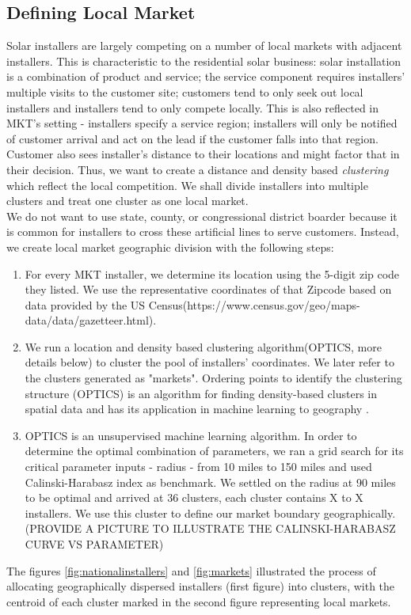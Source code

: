 \documentclass[msom,blindrev]{informs3}
\begin{document}
\subsection{Defining Local Market}
\label{defining_local_market}
Solar installers are largely competing on a number of local markets with adjacent installers.  This is characteristic to the residential solar business: solar installation is a combination of product and service; the service component requires installers' multiple visits to the customer site;  customers tend to only seek out local installers and installers tend to only compete locally. This is also reflected in MKT's setting - installers specify a service region; installers will only be notified of customer arrival and act on the lead if the customer falls into that region. Customer also sees installer's distance to their locations and might factor that in their decision. Thus, we want to create a distance and density based \textit{clustering} which reflect the local competition. We shall divide installers into multiple clusters and treat one cluster as one local market. \\
We do not want to use state, county, or congressional district boarder because it is common for installers to cross these artificial lines to serve customers. Instead, we create local market geographic division with the following steps:
\begin{enumerate}
	\item For every MKT installer, we determine its location using the 5-digit zip code they listed. We use the representative coordinates of that Zipcode based on data provided by the US Census(https://www.census.gov/geo/maps-data/data/gazetteer.html).
	\item  We run a location and density based clustering algorithm(OPTICS, more details below) to cluster the pool of installers' coordinates. We later refer to the clusters generated as "markets".  Ordering points to identify the clustering structure (OPTICS) is an algorithm for finding density-based clusters in spatial data \citep{ankerst1999optics} and has its application in machine learning to geography \citep{teimouri2016method}.
	\item OPTICS is an unsupervised machine learning algorithm. In order to determine the optimal combination of parameters, we ran a grid search for its critical parameter inputs - radius - from 10 miles to 150 miles and used Calinski-Harabasz index as benchmark. We settled on the radius at 90 miles to be optimal and arrived at 36 clusters, each cluster contains X to X installers. We use this cluster to define our market boundary geographically. (PROVIDE A PICTURE TO ILLUSTRATE THE CALINSKI-HARABASZ CURVE VS PARAMETER)
\end{enumerate}
The figures \ref{fig:nationalinstallers} and \ref{fig:markets} illustrated the process of allocating geographically dispersed installers (first figure) into clusters, with the centroid of each cluster marked in the second figure representing local markets.
\end{document}
